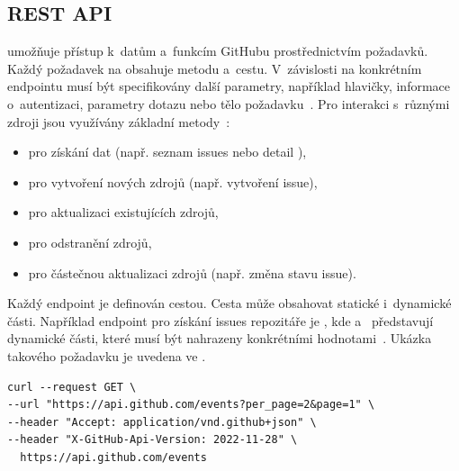 \subsection{REST API}
\label{subsec:github_api_rest}
\REST \API umožňuje přístup k~datům a~funkcím GitHubu prostřednictvím \HTTP požadavků. Každý požadavek na \REST \API obsahuje \HTTP metodu a~cestu. V~závislosti na konkrétním endpointu musí být specifikovány další parametry, například hlavičky, informace o~autentizaci, parametry dotazu nebo tělo požadavku~\cite{github_rest_api}.
Pro interakci s~různými zdroji jsou využívány základní \HTTP metody~\cite{github_rest_api}:
\begin{itemize}
  \item {} pro získání dat (např. seznam issues nebo detail \PR),
  \item {} pro vytvoření nových zdrojů (např. vytvoření issue),
  \item {} pro aktualizaci existujících zdrojů,
  \item {} pro odstranění zdrojů,
  \item {} pro částečnou aktualizaci zdrojů (např. změna stavu issue).
\end{itemize}
Každý endpoint je definován cestou. Cesta může obsahovat statické i~dynamické části. Například endpoint pro získání issues repozitáře je , kde  a~ představují dynamické části, které musí být nahrazeny konkrétními hodnotami~\cite{github_rest_api}. Ukázka takového požadavku je uvedena ve .

\begin{listing}[H]
\begin{verbatim}
curl --request GET \
--url "https://api.github.com/events?per_page=2&page=1" \
--header "Accept: application/vnd.github+json" \
--header "X-GitHub-Api-Version: 2022-11-28" \
  https://api.github.com/events
\end{verbatim}
  \caption{Ukázka \REST \API požadavku na GitHub pro získání událostí celého GitHubu.}
  \label{lst:github_rest_example}
\end{listing}

